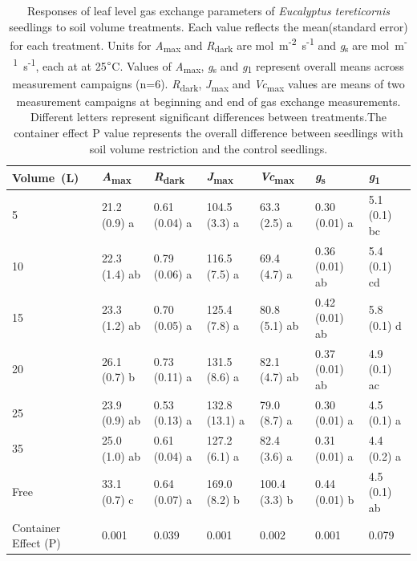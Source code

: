 \documentclass[a4paper]{article}\usepackage[]{graphicx}\usepackage[]{color}
\begin{document}

\begin{table}
\centering
\caption{Responses of leaf level gas exchange parameters of \textit{Eucalyptus tereticornis} seedlings to soil volume treatments. Each value reflects the mean(standard error) for each treatment. Units for \textit{A}\textsubscript{max} and \textit{R}\textsubscript{dark} are {\textmugreek}mol~m\textsuperscript{-2}~s\textsuperscript{-1} and \textit{g}\textsubscript{s} are mol~m\textsuperscript{-1}~s\textsuperscript{-1}, each at at 25$\degree$C. Values of \textit{A}\textsubscript{max}, \textit{g}\textsubscript{s} and \textit{g}\textsubscript{1} represent overall means across measurement campaigns (n=6). \textit{R}\textsubscript{dark}, \textit{J}\textsubscript{max} and \textit{Vc}\textsubscript{max} values are means of two measurement campaigns at beginning and end of gas exchange measurements. Different letters represent significant differences between treatments.The container effect P value represents the overall difference between seedlings with soil volume restriction and the control seedlings.} 
\label{table:Table2}
\begin{tabular}{lllllll}
  \hline
Volume~(L) & \textit{A}\textsubscript{max} & \textit{R}\textsubscript{dark} & \textit{J}\textsubscript{max} & \textit{Vc}\textsubscript{max} & \textit{g}\textsubscript{s} & \textit{g}\textsubscript{1} \\ 
  \hline
5 & 21.2 (0.9) a & 0.61 (0.04) a & 104.5 (3.3) a & 63.3 (2.5) a & 0.30 (0.01) a & 5.1 (0.1) bc \\ 
  10 & 22.3 (1.4) ab & 0.79 (0.06) a & 116.5 (7.5) a & 69.4 (4.7) a & 0.36 (0.01) ab & 5.4 (0.1) cd \\ 
  15 & 23.3 (1.2) ab & 0.70 (0.05) a & 125.4 (7.8) a & 80.8 (5.1) ab & 0.42 (0.01) ab & 5.8 (0.1) d \\ 
  20 & 26.1 (0.7) b & 0.73 (0.11) a & 131.5 (8.6) a & 82.1 (4.7) ab & 0.37 (0.01) ab & 4.9 (0.1) ac \\ 
  25 & 23.9 (0.9) ab & 0.53 (0.13) a & 132.8 (13.1) a & 79.0 (8.7) a & 0.30 (0.01) a & 4.5 (0.1) a \\ 
  35 & 25.0 (1.0) ab & 0.61 (0.04) a & 127.2 (6.1) a & 82.4 (3.6) a & 0.31 (0.01) a & 4.4 (0.2) a \\ 
  Free & 33.1 (0.7) c & 0.64 (0.07) a & 169.0 (8.2) b & 100.4 (3.3) b & 0.44 (0.01) b & 4.5 (0.1) ab \\ 
   \hline
Container Effect (P) & 0.001 & 0.039 & 0.001 & 0.002 & 0.001 & 0.079 \\ 
   \hline
\end{tabular}
\end{table}
\end{document}
